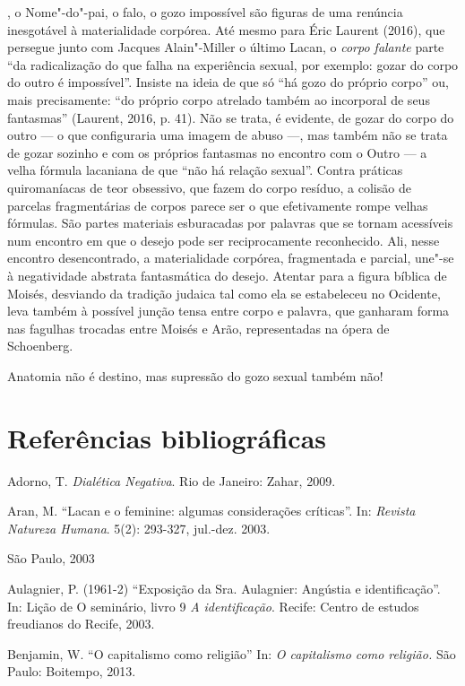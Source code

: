 , o Nome"-do"-pai, o falo, o gozo impossível são figuras de uma
renúncia inesgotável à materialidade corpórea. Até mesmo para Éric
Laurent (2016), que persegue junto com Jacques Alain"-Miller o último
Lacan, o \emph{corpo falante} parte ``da radicalização do que falha na
experiência sexual, por exemplo: gozar do corpo do outro é impossível''.
Insiste na ideia de que só ``há gozo do próprio corpo'' ou, mais
precisamente: ``do próprio corpo atrelado também ao incorporal de seus
fantasmas'' (Laurent, 2016, p. 41). Não se trata, é evidente, de gozar
do corpo do outro --- o que configuraria uma imagem de abuso ---, mas
também não se trata de gozar sozinho e com os próprios fantasmas no
encontro com o Outro --- a velha fórmula lacaniana de que ``não há
relação sexual''. Contra práticas quiromaníacas de teor obsessivo, que
fazem do corpo resíduo, a colisão de parcelas fragmentárias de corpos
parece ser o que efetivamente rompe velhas fórmulas. São partes
materiais esburacadas por palavras que se tornam acessíveis num encontro
em que o desejo pode ser reciprocamente reconhecido. Ali, nesse encontro
desencontrado, a materialidade corpórea, fragmentada e parcial, une"-se à
negatividade abstrata fantasmática do desejo. Atentar para a figura
bíblica de Moisés, desviando da tradição judaica tal como ela se
estabeleceu no Ocidente, leva também à possível junção tensa entre corpo
e palavra, que ganharam forma nas fagulhas trocadas entre Moisés e Arão,
representadas na ópera de Schoenberg.

Anatomia não é destino, mas supressão do gozo sexual também não!

\section{Referências bibliográficas}

Adorno, T. \emph{Dialética Negativa}. Rio de Janeiro: Zahar, 2009.

Aran, M. ``Lacan e o feminine: algumas considerações críticas''. In:
\emph{Revista Natureza Humana}. 5(2): 293-327, jul.-dez. 2003.

São Paulo, 2003

Aulagnier, P. (1961-2) ``Exposição da Sra. Aulagnier: Angústia e
identificação''. In: Lição  de O seminário, livro 9 \emph{A
identificação}. Recife: Centro de estudos freudianos do Recife, 2003.

Benjamin, W. ``O capitalismo como religião'' In: \emph{O capitalismo
como religião.} São Paulo: Boitempo, 2013.

